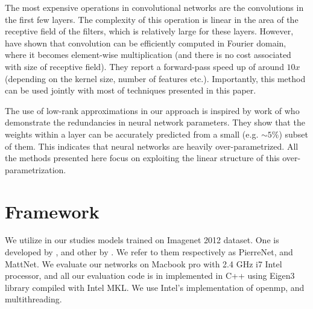 


The most expensive operations in convolutional networks are the
convolutions in the first few layers. The complexity of this operation
is linear in the area of the receptive field of the filters, which is
relatively large for these layers.  However, \cite{mathieu2013fast} have shown that convolution can be
efficiently computed in Fourier domain, where it becomes element-wise
multiplication (and there is no cost associated with size of receptive
field). They report a forward-pass speed up of around $10x$ (depending on
the kernel size, number of features etc.).  Importantly, this method can
be used jointly with most of techniques presented in this paper.

The use of low-rank approximations in our approach is inspired by work
of \cite{denil2013predicting} who demonstrate the redundancies in neural
network parameters. They show that the weights within a layer can be
accurately predicted from a small (e.g. $\sim 5\%$) subset of them. This
indicates that neural networks are heavily over-parametrized.  All the
methods presented here focus on exploiting the linear structure of this
over-parametrization.

\section{Framework}
We utilize in our studies models trained on Imagenet 2012 dataset. One is developed
by \cite{sermanet2013overfeat}, and other by \cite{zeiler2013visualizing}.
We refer to them respectively as PierreNet, and MattNet. We evaluate our networks on Macbook pro with 2.4 GHz i7 Intel processor, and
all our evaluation code is in implemented in C++ using Eigen3 library \cite{eigenweb} compiled with Intel MKL. We use Intel's implementation of openmp, and multithreading. 
